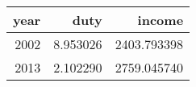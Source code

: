 \begin{tabular}{rrr}
\toprule
 year &      duty &       income \\
\midrule
 2002 &  8.953026 &  2403.793398 \\
 2013 &  2.102290 &  2759.045740 \\
\bottomrule
\end{tabular}
